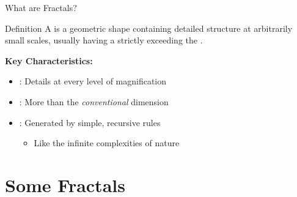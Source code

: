 \begin{frame}{What are Fractals?}
  \begin{conceptbox}{Definition}
    A  is a geometric shape containing detailed
    structure at arbitrarily small scales, usually having a
     strictly exceeding the
    .
  \end{conceptbox}

  \vspace{0.1cm}

  \textbf{Key Characteristics:}
  \begin{itemize}
    \item {}: Details at every level of magnification
    \item {}: More than the \textit{conventional} dimension
    \item {}: Generated by simple, recursive rules
      \begin{itemize}
        \item Like the infinite complexities of nature
      \end{itemize}
  \end{itemize}

  \vspace{0.1cm}

  \pause
  \begin{center}
  \end{center}
\end{frame}

\section{Some Fractals}

